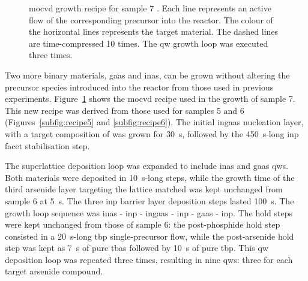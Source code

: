 \begin{figure}
    \caption{\acs{mocvd} growth recipe for sample 7 \cite{Brugnolotto2023_2}. Each line represents an active flow of the corresponding precursor into the reactor. The colour of the horizontal lines represents the target material. The dashed lines are time-compressed \num{10} times. The \acl{qw} growth loop was executed three times.}
    \label{subfig:recipe7}
\end{figure}


Two more binary materials, \acf{gaas} and \acf{inas}, can be grown without altering the precursor species introduced into the reactor from those used in previous experiments. Figure~\ref{subfig:recipe7} shows the \acs{mocvd} recipe used in the growth of sample 7. This new recipe was derived from those used for samples 5 and 6 (Figures~\ref{subfig:recipe5} and \ref{subfig:recipe6}). The initial \acs{ingaas} nucleation layer, with a target composition of  was grown for \qty{30}{\second}, followed by the \qty{450}{\second}-long \acs{inp}  facet stabilisation step.

The superlattice deposition loop was expanded to include \acs{inas} and \acs{gaas} \acl{qw}s. Both materials were deposited in \qty{10}{\second}-long steps, while the growth time of the third arsenide layer targeting the lattice matched  was kept unchanged from sample 6 at \qty{5}{\second}. The three \acs{inp} barrier layer deposition steps lasted \qty{100}{\second}. The growth loop sequence was \acs{inas} - \acs{inp} - \acs{ingaas} - \acs{inp} - \acs{gaas} - \acs{inp}. The hold steps were kept unchanged from those of sample 6: the post-phosphide hold step consisted in a \qty{20}{\second}-long \acf{tbp} single-precursor flow, while the post-arsenide hold step was kept as \qty{7}{\second} of pure \acf{tbas} followed by \qty{10}{\second} of pure \acs{tbp}. This \acl{qw} deposition loop was repeated three times, resulting in nine \acl{qw}s: three for each target arsenide compound.

